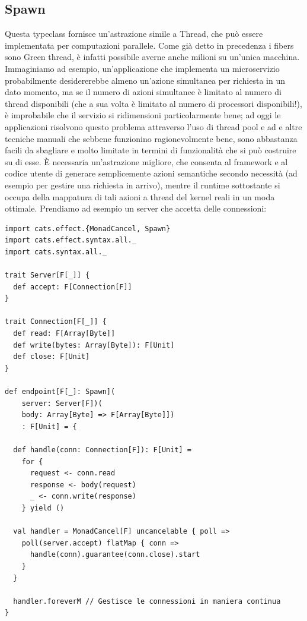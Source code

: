\subsection{Spawn}
Questa typeclass fornisce un’astrazione simile a Thread, che può essere implementata per computazioni parallele. Come già detto in precedenza i fibers sono Green thread, è infatti possibile averne anche milioni su un’unica macchina. Immaginiamo ad esempio, un'applicazione che implementa un microservizio probabilmente desidererebbe almeno un'azione simultanea per richiesta in un dato momento, ma se il numero di azioni simultanee è limitato al numero di thread disponibili (che a sua volta è limitato al numero di processori disponibili!), è improbabile che il servizio si ridimensioni particolarmente bene; ad oggi le applicazioni risolvono questo problema attraverso l'uso di thread pool e ad e altre tecniche manuali che sebbene funzionino ragionevolmente bene, sono abbastanza facili da sbagliare e molto limitate in termini di funzionalità che si può costruire su di esse. È necessaria un'astrazione migliore, che consenta al framework e al codice utente di generare semplicemente azioni semantiche secondo necessità (ad esempio per gestire una richiesta in arrivo), mentre il runtime sottostante si occupa della mappatura di tali azioni a thread del kernel reali in un moda ottimale. Prendiamo ad esempio un server che accetta delle connessioni:

\begin{verbatim}
import cats.effect.{MonadCancel, Spawn}
import cats.effect.syntax.all._
import cats.syntax.all._

trait Server[F[_]] {
  def accept: F[Connection[F]]
}

trait Connection[F[_]] {
  def read: F[Array[Byte]]
  def write(bytes: Array[Byte]): F[Unit]
  def close: F[Unit]
}

def endpoint[F[_]: Spawn](
    server: Server[F])(
    body: Array[Byte] => F[Array[Byte]])
    : F[Unit] = {

  def handle(conn: Connection[F]): F[Unit] =
    for {
      request <- conn.read
      response <- body(request)
      _ <- conn.write(response)
    } yield ()

  val handler = MonadCancel[F] uncancelable { poll =>
    poll(server.accept) flatMap { conn =>
      handle(conn).guarantee(conn.close).start
    }
  }

  handler.foreverM // Gestisce le connessioni in maniera continua
}
\end{verbatim}

